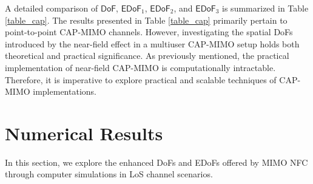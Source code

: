 \documentclass[journal]{IEEEtran}
\theoremstyle{definition}
\begin{document}
%
%
%
A detailed comparison of ${\mathsf{DoF}}$, ${\mathsf{EDoF}}_1$, ${\mathsf{EDoF}}_2$, and ${\mathsf{EDoF}}_3$ is summarized in Table \ref{table_cap}. The results presented in Table \ref{table_cap} primarily pertain to point-to-point CAP-MIMO channels. However, investigating the spatial DoFs introduced by the near-field effect in a multiuser CAP-MIMO setup holds both theoretical and practical significance. As previously mentioned, the practical implementation of near-field CAP-MIMO is computationally intractable. Therefore, it is imperative to explore practical and scalable techniques of CAP-MIMO implementations.




\section{Numerical Results}\label{Section:Numerical}
In this section, we explore the enhanced DoFs and EDoFs offered by MIMO NFC through computer simulations in LoS channel scenarios.
\end{document}
